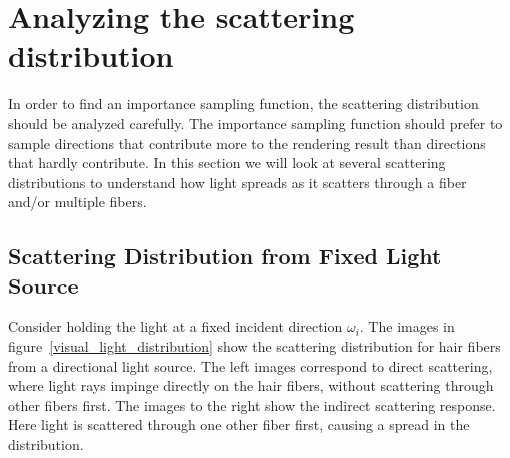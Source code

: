 \documentclass[11pt,a4paper]{report}
\begin{document}
\section{Analyzing the scattering distribution}

In order to find an importance sampling function, the scattering distribution should be analyzed carefully. The importance sampling function should prefer to sample directions that contribute more to the rendering result than directions that hardly contribute. In this section we will look at several scattering distributions to understand how light spreads as it scatters through a fiber and/or multiple fibers.

\subsection{Scattering Distribution from Fixed Light Source}

Consider holding the light at a fixed incident direction $\omega_i$. The images in figure~\ref{visual_light_distribution} show the scattering distribution for hair fibers from a directional light source. The left images correspond to direct scattering, where light rays impinge directly on the hair fibers, without scattering through other fibers first. The images to the right show the indirect scattering response. Here light is scattered through one other fiber first, causing a spread in the distribution.
\end{document}
